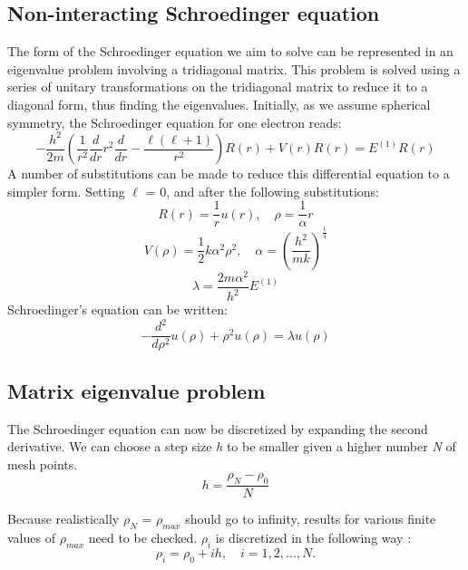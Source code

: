 \documentclass[10pt,showpacs,preprintnumbers,footinbib,amsmath,amssymb,aps,prl,twocolumn,groupedaddress,superscriptaddress,showkeys]{revtex4-1}
\begin{document}
	\subsection{Non-interacting Schroedinger equation}	
The form of the Schroedinger equation we aim to solve can be represented in an eigenvalue problem involving a tridiagonal matrix. This problem is solved using a series of unitary transformations on the tridiagonal matrix to reduce it to a diagonal form, thus finding the eigenvalues. Initially, as we assume spherical symmetry, the Schroedinger equation for one electron reads:
 \begin{equation}	
	-\frac{h^{2}}{2m}\left(\frac{1}{r^{2}}\frac{d}{dr}r^{2}\frac{d}{dr} - \frac{\ell(\ell+1)}{r^{2}}\right)R(r) + V(r)R(r) = E^{(1)}R(r)
	\end{equation}
A number of substitutions can be made to reduce this differential equation to a simpler form. Setting $\ell$ = 0, and after the following substitutions: 
\begin{equation}
R(r) = \frac{1}{r}u(r),\quad   \rho = \frac{1}{\alpha}r
\end{equation}
\begin{equation}
V(\rho) = \frac{1}{2}k\alpha^{2}\rho^{2},\quad    \alpha = \left(\frac{h^{2}}{mk}\right)^{\frac{1}{4}}
\end{equation}
\begin{equation}
\lambda = \frac{2m\alpha^{2}}{h^{2}}E^{(1)}
\end{equation}
Schroedinger's equation can be written:
\begin{equation}
-\frac{d^{2}}{d\rho^{2}}u(\rho) + \rho^{2}u(\rho) = \lambda u(\rho)
\end{equation}

\subsection{Matrix eigenvalue problem}	
The Schroedinger equation can now be discretized by expanding the second derivative. We can choose a step size {\it h} to be smaller given a higher number {\it N} of mesh points.
\begin{equation}
h = \frac{\rho_{N} - \rho_{0}}{N}
\end{equation}

 Because realistically $\rho_{N}$ = $\rho_{max}$ should go to infinity, results for various finite values of $\rho_{max}$ need to be checked. $\rho_{i}$  is discretized in the following way
:
\begin{equation}
\rho_{i} = \rho_{0} + ih,\quad i = 1, 2, . . . , N.
\end{equation}
\end{document}
